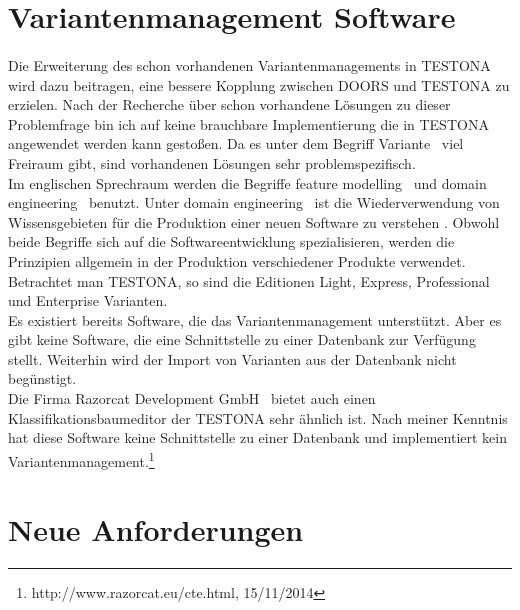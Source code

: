 \newpage
\section{Variantenmanagement Software}
\paragraph{}
Die Erweiterung des schon vorhandenen Variantenmanagements in TESTONA wird dazu beitragen, eine bessere Kopplung zwischen DOORS und TESTONA zu erzielen. Nach der Recherche über schon vorhandene Lösungen zu dieser Problemfrage bin ich auf keine brauchbare Implementierung die in TESTONA angewendet werden kann gestoßen. Da es unter dem Begriff \glqq Variante\grqq~ viel Freiraum gibt, sind vorhandenen Lösungen sehr problemspezifisch.\\


Im englischen Sprechraum werden die Begriffe \glqq feature modelling\grqq~ und \glqq domain engineering\grqq~ benutzt. Unter \glqq domain engineering\grqq~ ist die Wiederverwendung von Wissensgebieten für die Produktion einer neuen Software zu verstehen \cite{DomainEng}. Obwohl beide Begriffe sich auf die Softwareentwicklung spezialisieren, werden die Prinzipien allgemein in der Produktion verschiedener Produkte verwendet. Betrachtet man TESTONA, so sind die Editionen Light, Express, Professional und Enterprise Varianten.\\


Es existiert bereits Software, die das Variantenmanagement unterstützt. Aber es gibt keine Software, die eine Schnittstelle zu einer Datenbank zur Verfügung stellt. Weiterhin wird der Import von Varianten aus der Datenbank nicht begünstigt.\\


Die Firma \glqq Razorcat Development GmbH\grqq~ bietet auch einen Klassifikationsbaumeditor der TESTONA sehr ähnlich ist. Nach meiner Kenntnis hat diese Software keine Schnittstelle zu einer Datenbank und implementiert kein Variantenmanagement.\footnote{http://www.razorcat.eu/cte.html, 15/11/2014}



\newpage
\section{Neue Anforderungen}
